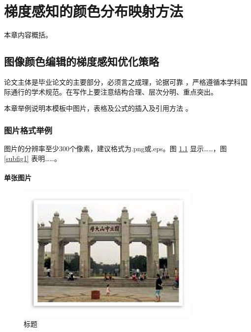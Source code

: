 \chapter{梯度感知的颜色分布映射方法}
本章内容概括。
\section{图像颜色编辑的梯度感知优化策略}
论文主体是毕业论文的主要部分，必须言之成理，论据可靠 \cite{tighe2013finding}，严格遵循本学科国际通行的学术规范。在写作上要注意结构合理、层次分明、重点突出。

本章举例说明本模板中图片，表格及公式的插入及引用方法 \cite{liu2011sift}。

\subsection{图片格式举例}

图片的分辨率至少300个像素，建议格式为.png或.eps。图 \ref{fig1} 显示……，图 \ref{subfig1} 表明……。

\subsubsection{单张图片}
\begin{figure}[h]
	\centering
	\includegraphics[width=0.8\textwidth]{figure/fig1.png}
	\caption{标题} 
	\label{fig1}
\end{figure}

